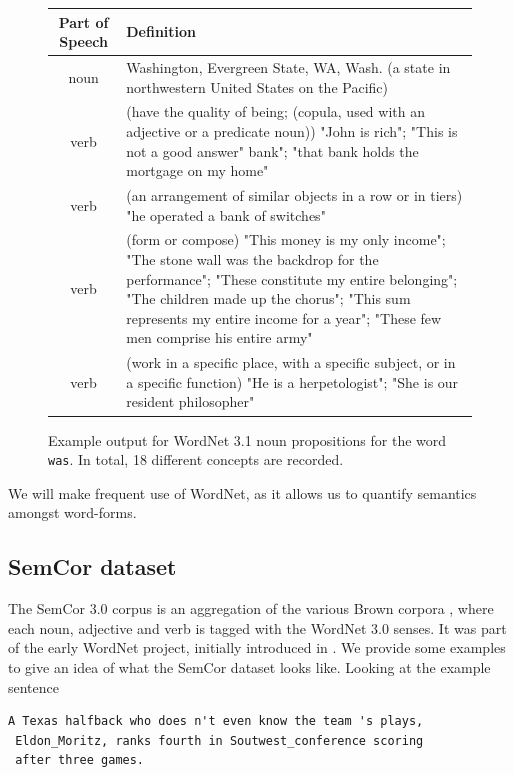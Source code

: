 \documentclass[a4paper,12pt,twoside,openright]{report}
\begin{document}
\begin{figure}
\begin{center}
\begin{tabular}{ | c | p{11cm} | } 
 \hline
 Part of Speech & Definition \\ 
 \hline
noun     & Washington, Evergreen State, WA, Wash. (a state in northwestern United States on the Pacific) \\ 
verb     & (have the quality of being; (copula, used with an adjective or a predicate noun)) "John is rich"; "This is not a good answer"
 bank"; "that bank holds the mortgage on my home" \\ 
 verb     & (an arrangement of similar objects in a row or in tiers) "he operated a bank of switches"  \\ 
verb & (form or compose) "This money is my only income"; "The stone wall was the backdrop for the performance"; "These constitute my entire belonging"; "The children made up the chorus"; "This sum represents my entire income for a year"; "These few men comprise his entire army" \\ 
verb    & (work in a specific place, with a specific subject, or in a specific function) "He is a herpetologist"; "She is our resident philosopher"  \\ 
 \hline
\end{tabular}
\end{center}
\caption{Example output for WordNet 3.1 noun propositions for the word \texttt{was}. In total, 18 different concepts are recorded.}
\label{fig:was_synset}
\end{figure}

We will make frequent use of WordNet, as it allows us to quantify semantics amongst word-forms.

\subsection{SemCor dataset}

The SemCor 3.0 corpus is an aggregation of the various Brown corpora \cite{francis64}, where each noun, adjective and verb is tagged with the WordNet 3.0 senses.
It was part of the early WordNet project, initially introduced in \cite{miller94}.
We provide some examples to give an idea of what the SemCor dataset looks like.
Looking at the example sentence

\begin{verbatim}
A Texas halfback who does n't even know the team 's plays,
 Eldon_Moritz, ranks fourth in Soutwest_conference scoring 
 after three games.
\end{verbatim}
\end{document}
